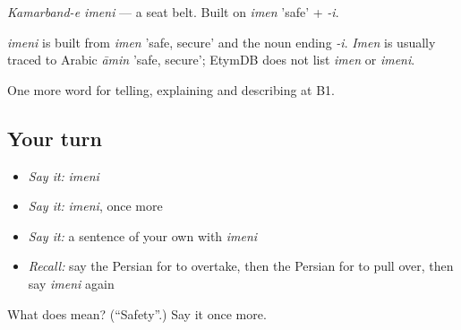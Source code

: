 \emph{Kamarband-e imeni} — a seat belt. Built on \emph{imen} 'safe' + \emph{-i}.

\begin{cousinweb}
\emph{imeni} is built from \emph{imen} 'safe, secure' and the noun ending \emph{-i}. \emph{Imen} is usually traced to Arabic \emph{āmin} 'safe, secure'; EtymDB does not list \emph{imen} or \emph{imeni}.
\end{cousinweb}

\begin{grammarlens}[title={What you've built}]
One more word for telling, explaining and describing at B1.
\end{grammarlens}

\subsection*{Your turn}
\begin{itemize}
\raggedright
  \item \emph{Say it:} \emph{imeni}
  \item \emph{Say it:} \emph{imeni}, once more
  \item \emph{Say it:} a sentence of your own with \emph{imeni}
  \item \emph{Recall:} say the Persian for to overtake, then the Persian for to pull over, then say \emph{imeni} again
\end{itemize}

\begin{tcolorbox}[breakable,colback=teal!4,colframe=teal!35!black,title={Before you move on}]
What does  mean? (\textquotedblleft{}Safety\textquotedblright{}.) Say it once more.
\end{tcolorbox}
